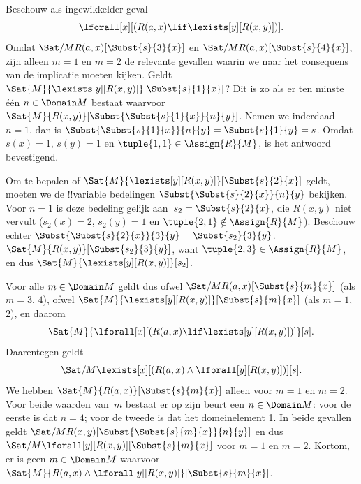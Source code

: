 \documentclass[../../../include/open-logic-section]{subfiles}
\begin{document}
\begin{ex}

Beschouw als ingewikkelder geval
\[
\lforall[x][(R(a,x) \lif \lexists[y][R(x,y)])].
\]
Omdat $\Sat/{M}{R(a,x)}[\Subst{s}{3}{x}]$ en
$\Sat/{M}{R(a,x)}[\Subst{s}{4}{x}]$, zijn alleen $m = 1$
en $m = 2$ de relevante gevallen waarin we naar het consequens van de
implicatie moeten kijken. Geldt $\Sat{M}{\lexists[y][R(x,y)]}[\Subst{s}{1}{x}]$?
Dit is zo als er ten minste één $n \in \Domain M$ bestaat waarvoor
$\Sat{M}{R(x,y)}[\Subst{\Subst{s}{1}{x}}{n}{y}]$. Nemen we inderdaad
$n = 1$, dan is $\Subst{\Subst{s}{1}{x}}{n}{y} = \Subst{s}{1}{y} =
s$. Omdat $s(x) = 1$, $s(y) = 1$ en $\tuple{1,1} \in \Assign{R}{M}$,
is het antwoord bevestigend.

Om te bepalen of $\Sat{M}{\lexists[y][R(x,y)]}[\Subst{s}{2}{x}]$ geldt,
moeten we de !!{variable} bedelingen
$\Subst{\Subst{s}{2}{x}}{n}{y}$ bekijken. Voor $n = 1$ is deze bedeling
gelijk aan~$s_2 = \Subst{s}{2}{x}$, die $R(x,y)$ niet vervult ($s_2(x) =
2$, $s_2(y) = 1$ en $\tuple{2,1}\notin \Assign{R}{M}$). Beschouw echter
$\Subst{\Subst{s}{2}{x}}{3}{y} = \Subst{s_2}{3}{y}$.
$\Sat{M}{R(x,y)}[\Subst{s_2}{3}{y}]$, want $\tuple{2,3} \in
\Assign{R}{M}$, en dus $\Sat{M}{\lexists[y][R(x,y)]}[s_2]$.

Voor alle $m \in \Domain M$ geldt dus ofwel
$\Sat/{M}{R(a,x)}[\Subst{s}{m}{x}]$ (als $m = 3$, $4$), ofwel
$\Sat{M}{\lexists[y][R(x,y)]}[\Subst{s}{m}{x}]$ (als $m = 1$, $2$), en daarom
\[
\Sat{M}{\lforall[x][(R(a,x) \lif \lexists[y][R(x,y)])]}[s].
\]
Daarentegen geldt
\[
\Sat/{M}{\lexists[x][(R(a,x) \land \lforall[y][R(x,y)])]}[s].
\]
We hebben $\Sat{M}{R(a,x)}[\Subst{s}{m}{x}]$ alleen voor $m = 1$ en $m =
2$. Voor beide waarden van~$m$ bestaat er op zijn beurt een $n \in
\Domain M$: voor de eerste is dat $n = 4$; voor de tweede is dat het
domeinelement 1. In beide gevallen geldt
$\Sat/{M}{R(x,y)}[\Subst{\Subst{s}{m}{x}}{n}{y}]$ en dus
$\Sat/{M}{\lforall[y][R(x,y)]}[\Subst{s}{m}{x}]$ voor $m = 1$ en $m =
2$. Kortom, er is geen $m \in \Domain M$ waarvoor $\Sat{M}{R(a,x)
\land \lforall[y][R(x,y)]}[\Subst{s}{m}{x}]$.
\end{ex}
\end{document}

